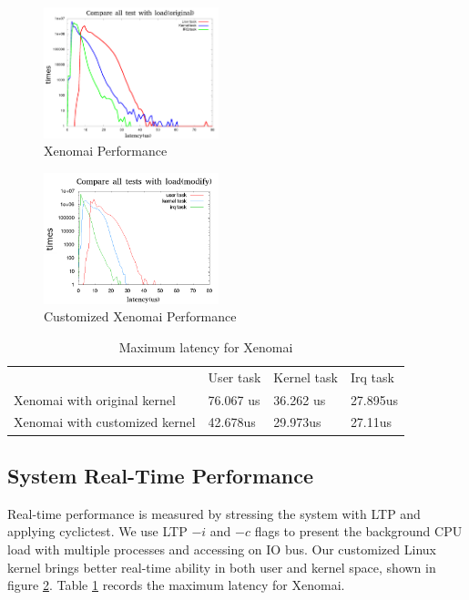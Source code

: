 \documentclass[conference]{IEEEtran}
\begin{document}
\begin{figure}	
	\centering
	\includegraphics[width=2in]{img/xenomai_load.png}
	\caption{Xenomai Performance}
	\label{fig:xeno_perf}
\end{figure}

\begin{figure}
	\centering
	\includegraphics[width=2in]{img/xenomai_load_modify.png}
	\caption{Customized Xenomai Performance}
	\label{fig:xeno_perf_modify}
\end{figure}

\begin{table}[]
\centering
\caption{Maximum latency for Xenomai}
\label{xeno_compare}
\begin{tabular}{llll}
                              & User task & Kernel task & Irq task \\
Xenomai with original kernel  & 76.067 us & 36.262 us   & 27.895us \\
Xenomai with customized kernel & 42.678us  & 29.973us    & 27.11us 
\end{tabular}
\end{table}

\subsection{System Real-Time Performance}

Real-time performance is measured by stressing the system with LTP and applying cyclictest. We use LTP $-i$ and $-c$ flags to present the background CPU load with multiple processes and accessing on IO bus. Our customized Linux kernel brings better real-time ability in both user and kernel space, shown in figure \ref{fig:xeno_perf_modify}. Table \ref{xeno_compare} records the maximum latency for Xenomai.
\end{document}
